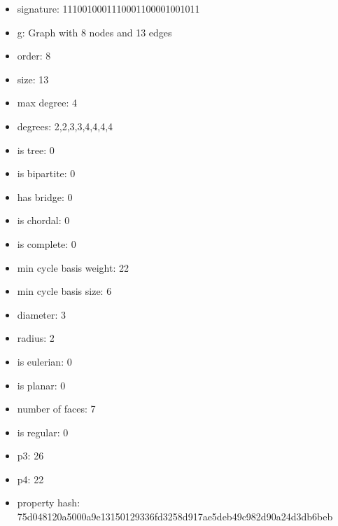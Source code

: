 \begin{itemize}
\item signature: 1110010001110001100001001011
\item g: Graph with 8 nodes and 13 edges
\item order: 8
\item size: 13
\item max degree: 4
\item degrees: 2,2,3,3,4,4,4,4
\item is tree: 0
\item is bipartite: 0
\item has bridge: 0
\item is chordal: 0
\item is complete: 0
\item min cycle basis weight: 22
\item min cycle basis size: 6
\item diameter: 3
\item radius: 2
\item is eulerian: 0
\item is planar: 0
\item number of faces: 7
\item is regular: 0
\item p3: 26
\item p4: 22
\item property hash: 75d048120a5000a9e13150129336fd3258d917ae5deb49c982d90a24d3db6beb
\end{itemize}
\newpage
\begin{figure}
\end{figure}
